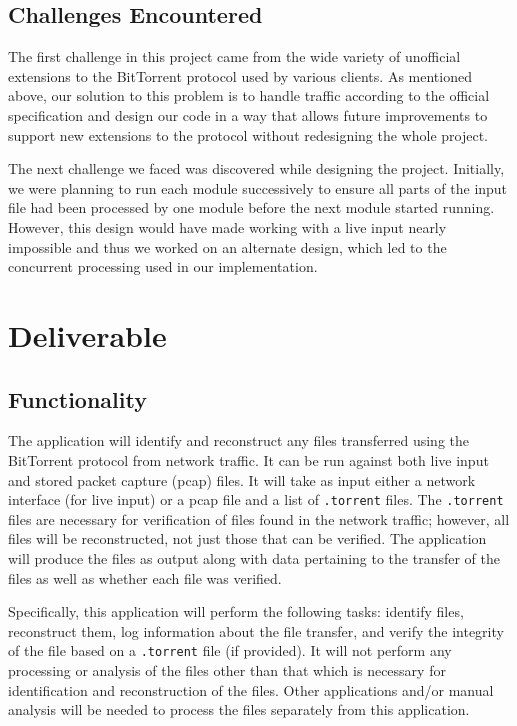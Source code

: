\documentclass{acm_proc_article-sp}
\begin{document}
\subsection{Challenges Encountered}
The first challenge in this project came from the wide variety of unofficial
extensions to the BitTorrent protocol used by various clients. As mentioned
above, our solution to this problem is to handle traffic according to the
official specification and design our code in a way that allows future
improvements to support new extensions to the protocol without redesigning the
whole project.

The next challenge we faced was discovered while designing the project.
Initially, we were planning to run each module successively to ensure all parts
of the input file had been processed by one module before the next module
started running. However, this design would have made working with a live input
nearly impossible and thus we worked on an alternate design, which led to the
concurrent processing used in our implementation.

\section{Deliverable}
\subsection{Functionality}
The application will identify and reconstruct any files transferred using the
BitTorrent protocol from network traffic. It can be run against both live input
and stored packet capture (pcap) files. It will take as input either a network
interface (for live input) or a pcap file and a list of \texttt{.torrent}
files. The \texttt{.torrent} files are necessary for verification of files found
in the network traffic; however, all files will be reconstructed, not just those
that can be verified. The application will produce the files as output along
with data pertaining to the transfer of the files as well as whether each file
was verified.

Specifically, this application will perform the following tasks: identify files,
reconstruct them, log information about the file transfer, and verify the
integrity of the file based on a \texttt{.torrent} file (if provided). It will not
perform any processing or analysis of the files other than that which is
necessary for identification and reconstruction of the files. Other applications
and/or manual analysis will be needed to process the files separately from this
application.
\end{document}
